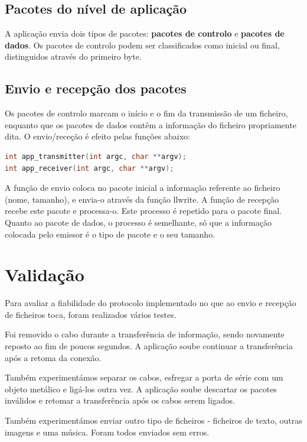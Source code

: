 \documentclass[11pt,a4paper,reqno]{article}
\numberwithin{equation}{section}
\begin{document}
\subsection{Pacotes do nível de aplicação}

A aplicação envia dois tipos de pacotes: \textbf{pacotes de controlo} e \textbf{pacotes de dados}. Os pacotes de controlo podem ser classificados como inicial ou final, distinguidos através do primeiro byte.

\subsection{Envio e recepção dos pacotes}

Os pacotes de controlo marcam o início e o fim da transmissão de um ficheiro, enquanto que os pacotes de dados contêm a informação do ficheiro propriamente dita. O envio/receção é efeito pelas funções abaixo:

\begin{lstlisting}[language=C]
int app_transmitter(int argc, char **argv);
int app_receiver(int argc, char **argv);
\end{lstlisting}

A função de envio coloca no pacote inicial a informação referente ao ficheiro (nome, tamanho), e envia-o através da função llwrite. A função de recepção recebe este pacote e processa-o. Este processo é repetido para o pacote final. Quanto ao pacote de dados, o processo é semelhante, só que a informação colocada pelo emissor é o tipo de pacote e o seu tamanho.

\section{Validação}

Para avaliar a fiabilidade do protocolo implementado no que ao envio e recepção de ficheiros toca, foram realizados vários testes.

Foi removido o cabo durante a transferência de informação, sendo novamente reposto ao fim de poucos segundos. A aplicação soube continuar a transferência após a retoma da conexão.

Também experimentámos separar os cabos, esfregar a porta de série com um objeto metálico e ligá-los outra vez. A aplicação soube descartar os pacotes inválidos e retomar a transferência após os cabos serem ligados.

Também experimentámos enviar outro tipo de ficheiros - ficheiros de texto, outras imagens e uma música. Foram todos enviados sem erros.
\end{document}
